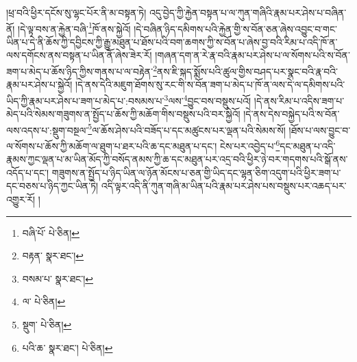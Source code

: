 །ཕྲ་བའི་ཕྱིར་དངོས་སུ་ལྷང་པོར་ནི་མ་བསྟན་ཏེ། འདུ་བྱེད་ཀྱི་རྐྱེན་བསྟན་པ་ལ་ཀུན་གཞིའི་རྣམ་པར་ཤེས་པ་བཞིན་ནོ། །དེ་ལྟ་བས་ན་རྐྱེན་བཞི་\footnote{བཞི་པོ་  པེ་ཅིན། }ཁོ་ནས་སྐྱེའོ། །དེ་བཞིན་ཉིད་དམིགས་པའི་རྐྱེན་གྱི་ས་བོན་ཅན་ཞེས་འབྱུང་བ་གང་ཡིན་པ་དེ་ནི་ཆོས་ཀྱི་དབྱིངས་ཀྱི་རྒྱུ་མཐུན་པ་ཐོས་པའི་བག་ཆགས་ཀྱི་ས་བོན་པ་ཞེས་བྱ་བའི་རིམ་པ་འདི་ཁོ་ན་ལས་དགོངས་ནས་བསྟན་པ་ཡིན་ནོ་ཞེས་ཟེར་རོ། །གཞན་དག་ན་རེ་རྣ་བའི་རྣམ་པར་ཤེས་པ་ལ་སོགས་པའི་ས་བོན་ཟག་པ་མེད་པ་ཆོས་ཉིད་ཀྱིས་གནས་པ་ལ་བརྟེན་\footnote{བརྟན་  སྣར་ཐང་། }ནས་ཇི་སྐད་སྨོས་པའི་ཚུལ་གྱིས་བཤད་པར་སྣང་བའི་རྣ་བའི་རྣམ་པར་ཤེས་པ་སྐྱེའོ། །དེ་ནས་དེའི་མཇུག་ཐོགས་སུ་རང་གི་ས་བོན་ཟག་པ་མེད་པ་ཁོ་ན་ལས་དེ་ལ་དམིགས་པའི་ཡིད་ཀྱི་རྣམ་པར་ཤེས་པ་ཟག་པ་མེད་པ་:བསམས་པ་\footnote{བསམ་པ་  སྣར་ཐང་། }ལས་\footnote{ལ་  པེ་ཅིན། }བྱུང་བས་བསྡུས་པའོ། །དེ་ནས་རིམ་པ་འདིས་ཟག་པ་མེད་པའི་སེམས་གཟུགས་ན་སྤྱོད་པ་ཆོས་ཀྱི་མཆོག་གིས་བསྡུས་པའི་བར་སྐྱེའོ། །དེ་ནས་དེས་བསྐྱེད་པའི་ས་བོན་ལས་འདས་པ་:སྡུག་བསྔལ་\footnote{སྡུག་  པེ་ཅིན། }ལ་ཆོས་ཤེས་པའི་བཟོད་པ་དང་མཚུངས་པར་ལྡན་པའི་སེམས་སོ། །ཐོས་པ་ལས་བྱུང་བ་ལ་སོགས་པ་ཆོས་ཀྱི་མཆོག་ལ་ཐུག་པ་ཐར་པའི་ཆ་དང་མཐུན་པ་དང་། ངེས་པར་འབྱེད་པ་\footnote{པའི་ཆ་  སྣར་ཐང་།  པེ་ཅིན། }དང་མཐུན་པ་འདི་རྣམས་ཀྱང་ལྡན་པ་མ་ཡིན་མོད་ཀྱི་བསོད་ནམས་ཀྱི་ཆ་དང་མཐུན་པར་འདྲ་བའི་ཕྱིར་ཉེ་བར་གདགས་པའི་སྒོ་ནས་འདོད་པ་དང་། གཟུགས་ན་སྤྱོད་པ་ཉིད་ཡིན་ལ་ཉོན་མོངས་པ་ཅན་གྱི་ཡིད་དང་ལྷན་ཅིག་འདུག་པའི་ཕྱིར་ཟག་པ་དང་བཅས་པ་ཉིད་ཀྱང་ཡིན་ཏེ། འདི་ལྟར་འདི་ནི་ཀུན་གཞི་མ་ཡིན་པའི་རྣམ་པར་ཤེས་པས་བསྡུས་པར་འཆད་པར་འགྱུར་རོ། །
